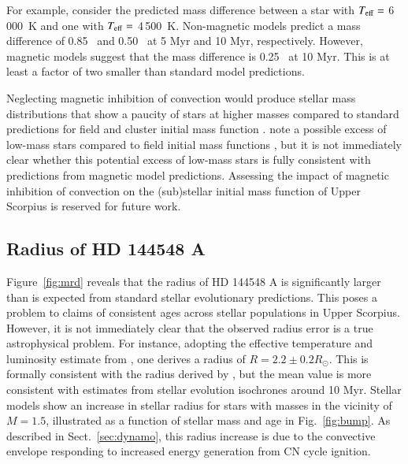 \documentclass{aa}
\begin{document}
For example, consider the predicted mass difference between a star with $T_{\rm eff} = $ 6\,000~K and one with $T_{\rm eff} = $ 4\,500~K. Non-magnetic models predict a mass difference of 0.85 \msun\ and 0.50 \msun\ at 5 Myr and 10 Myr, respectively. However, magnetic models suggest that the mass difference is 0.25 \msun\ at 10 Myr. This is at least a factor of two smaller than standard model predictions.

Neglecting magnetic inhibition of convection would produce stellar mass distributions that show a paucity of stars at higher masses compared to standard predictions for field and cluster initial mass function \citep[e.g.,][]{Salpeter1955, Kroupa2002, Chabrier2003}. \citet{Preibisch2002} note a possible excess of low-mass stars compared to field initial mass functions \citep{Scalo1998, Kroupa2002}, but it is not immediately clear whether this potential excess of low-mass stars is fully consistent with predictions from magnetic model predictions. Assessing the impact of magnetic inhibition of convection on the (sub)stellar initial mass function of Upper Scorpius is reserved for future work.


\subsection{Radius of HD 144548 A}
\label{sec:radius}
Figure~\ref{fig:mrd} reveals that the radius of HD 144548 A is significantly larger than is expected from standard stellar evolutionary predictions. This poses a problem to claims of consistent ages across stellar populations in Upper Scorpius. However, it is not immediately clear that the observed radius error is a true astrophysical problem. For instance, adopting the effective temperature and luminosity estimate from \citet{Pecaut2012}, one derives a radius of $R = 2.2 \pm 0.2 R_{\odot}$. This is formally consistent with the radius derived by \citep{Alonso2015}, but the mean value is more consistent with estimates from stellar evolution isochrones around 10 Myr. Stellar models show an increase in stellar radius for stars with masses in the vicinity of $M = 1.5$\msun, illustrated as a function of stellar mass and age in Fig.\ \ref{fig:bump}. As described in Sect.\ \ref{sec:dynamo}, this radius increase is due to the convective envelope responding to increased energy generation from CN cycle ignition.
\end{document}
